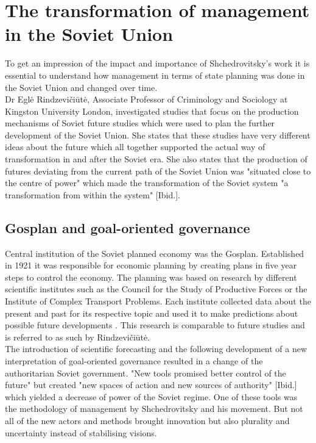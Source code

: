 \documentclass[11pt,a4paper]{article}
\begin{document}
\section{The transformation of management in the Soviet Union}

To get an impression of the impact and importance of Shchedrovitsky’s work it is essential to understand how management in terms of state planning was done in the Soviet Union and changed over time. \\ 
Dr Eglė Rindzevičiūtė, Associate Professor of Criminology and Sociology at Kingston University London, investigated studies that focus on the production mechanisms of Soviet future studies which were used to plan the further development of the Soviet Union. She states that these studies have very different ideas about the future which all together supported the actual way of transformation in and after the Soviet era. She also states that the production of futures deviating from the current path of the Soviet Union was "situated close to the centre of power" \cite[p. 1]{Rindzeviit2015} which made the transformation of the Soviet system "a transformation from within the system" [Ibid.].  

\subsection{Gosplan and goal-oriented governance}
Central institution of the Soviet planned economy was the Gosplan. Established in 1921 it was responsible for economic planning by creating plans in five year steps to control the economy. The planning was based on research by different scientific institutes such as the Council for the Study of Productive Forces or the Institute of Complex Transport Problems. Each institute collected data about the present and past for its respective topic and used it to make predictions about possible future developments \cite{Gosplan}. This research is comparable to future studies and is referred to as such by Rindzevičiūtė. \\
The introduction of scientific forecasting and the following development of a new interpretation of goal-oriented governance resulted in a change of the authoritarian Soviet government. "New tools promised better control of the future" \cite[p. 2]{Rindzeviit2015} but created "new spaces of action and new sources of authority" [Ibid.] which yielded a decrease of power of the Soviet regime. One of these tools was the methodology of management by Shchedrovitsky and his movement. But not all of the new actors and methods brought innovation but also plurality and uncertainty instead of stabilising visions. 
\end{document}
